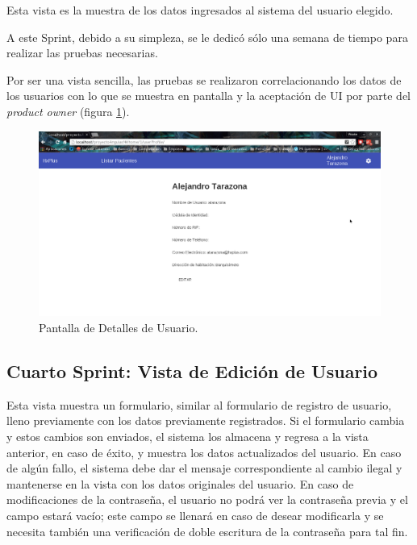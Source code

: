     Esta vista es la muestra de los datos ingresados al sistema del usuario elegido.
    
    A este Sprint, debido a su simpleza, se le dedicó sólo una semana de tiempo para realizar las pruebas necesarias.
    
    Por ser una vista sencilla, las pruebas se realizaron correlacionando los datos de los usuarios con lo que se muestra en pantalla y la aceptación de UI por parte del \textit{product owner} (figura \ref{Revisión}).
    
    \begin{figure}[htbp!]
        \begin{center}
            \includegraphics[width=.9\textwidth]{figures/p3}
        \end{center}
        \caption{Pantalla de Detalles de Usuario.}
        \label{Revisión}
    \end{figure}
    
    \subsection{Cuarto Sprint: Vista de Edición de Usuario}
    
    Esta vista muestra un formulario, similar al formulario de registro de usuario, lleno previamente con los datos  previamente registrados. Si el formulario cambia y estos cambios son enviados, el sistema los almacena y regresa a la vista anterior, en caso de éxito, y muestra los datos actualizados del usuario. En caso de algún fallo, el sistema debe dar el mensaje correspondiente al cambio ilegal y mantenerse en la vista con los datos originales del usuario. En caso de modificaciones de la contraseña, el usuario no podrá ver la contraseña previa y el campo estará vacío; este campo se llenará en caso de desear modificarla y se necesita también una verificación de doble escritura de la contraseña para tal fin.
    
